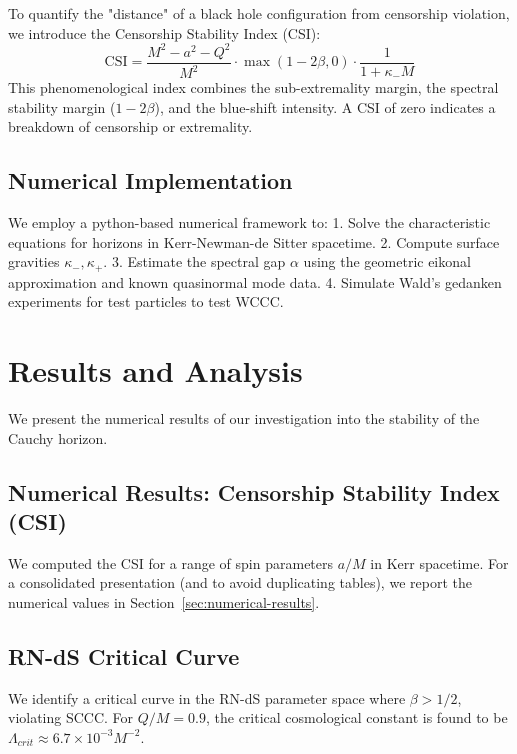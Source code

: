 \documentclass[12pt,a4paper]{article}
\begin{document}
To quantify the "distance" of a black hole configuration from censorship violation, we introduce the Censorship Stability Index (CSI):
\begin{equation}
\text{CSI} = \frac{M^2 - a^2 - Q^2}{M^2} \cdot \max(1 - 2\beta, 0) \cdot \frac{1}{1 + \kappa_- M}
\end{equation}
This phenomenological index combines the sub-extremality margin, the spectral stability margin ($1-2\beta$), and the blue-shift intensity. A CSI of zero indicates a breakdown of censorship or extremality.

\subsection{Numerical Implementation}

We employ a python-based numerical framework to:
1.  Solve the characteristic equations for horizons in Kerr-Newman-de Sitter spacetime.
2.  Compute surface gravities $\kappa_-, \kappa_+$.
3.  Estimate the spectral gap $\alpha$ using the geometric eikonal approximation and known quasinormal mode data.
4.  Simulate Wald's gedanken experiments for test particles to test WCCC.



\section{Results and Analysis}

We present the numerical results of our investigation into the stability of the Cauchy horizon.

\subsection{Numerical Results: Censorship Stability Index (CSI)}

We computed the CSI for a range of spin parameters $a/M$ in Kerr spacetime. For a consolidated presentation (and to avoid duplicating tables), we report the numerical values in Section~\ref{sec:numerical-results}.

\subsection{RN-dS Critical Curve}
We identify a critical curve in the RN-dS parameter space where $\beta > 1/2$, violating SCCC. For $Q/M = 0.9$, the critical cosmological constant is found to be $\Lambda_{crit} \approx 6.7 \times 10^{-3} M^{-2}$.
\end{document}
